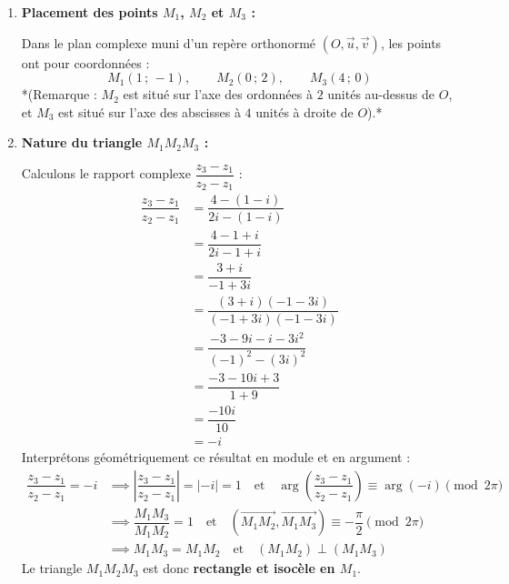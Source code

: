 \documentclass[12pt,a4paper]{article}
\begin{document}
\begin{enumerate}
    \begin{enumerate}
        \item \textbf{Placement des points $M_1$, $M_2$ et $M_3$ :}
        
        Dans le plan complexe muni d'un repère orthonormé $(O, \vec{u}, \vec{v})$, les points ont pour coordonnées :
        $$
        M_1(1 \,;\, -1), \qquad M_2(0 \,;\, 2), \qquad M_3(4 \,;\, 0)
        $$
        *(Remarque : $M_2$ est situé sur l'axe des ordonnées à $2$ unités au-dessus de $O$, et $M_3$ est situé sur l'axe des abscisses à $4$ unités à droite de $O$).*

        \item \textbf{Nature du triangle $M_1 M_2 M_3$ :}
        
        Calculons le rapport complexe $\dfrac{z_3 - z_1}{z_2 - z_1}$ :
        $$
        \begin{aligned}
            \dfrac{z_3 - z_1}{z_2 - z_1} &= \dfrac{4 - (1 - i)}{2i - (1 - i)} \\
            &= \dfrac{4 - 1 + i}{2i - 1 + i} \\
            &= \dfrac{3 + i}{-1 + 3i} \\
            &= \dfrac{(3 + i)(-1 - 3i)}{(-1 + 3i)(-1 - 3i)} \\
            &= \dfrac{-3 - 9i - i - 3i^2}{(-1)^2 - (3i)^2} \\
            &= \dfrac{-3 - 10i + 3}{1 + 9} \\
            &= \dfrac{-10i}{10} \\
            &= -i
        \end{aligned}
        $$
        Interprétons géométriquement ce résultat en module et en argument :
        $$
        \begin{aligned}
            \dfrac{z_3 - z_1}{z_2 - z_1} = -i &\implies \left| \dfrac{z_3 - z_1}{z_2 - z_1} \right| = |-i| = 1 \quad \text{et} \quad \arg\left( \dfrac{z_3 - z_1}{z_2 - z_1} \right) \equiv \arg(-i) \pmod{2\pi} \\
            &\implies \dfrac{M_1 M_3}{M_1 M_2} = 1 \quad \text{et} \quad \left( \overrightarrow{M_1 M_2}, \overrightarrow{M_1 M_3} \right) \equiv -\dfrac{\pi}{2} \pmod{2\pi} \\
            &\implies M_1 M_3 = M_1 M_2 \quad \text{et} \quad (M_1 M_2) \perp (M_1 M_3)
        \end{aligned}
        $$
        Le triangle $M_1 M_2 M_3$ est donc \textbf{rectangle et isocèle en $M_1$}.
    \end{enumerate}
\end{enumerate}
\end{document}
